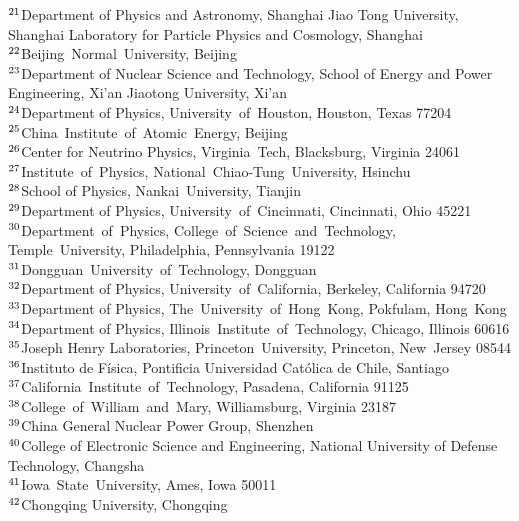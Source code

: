 {$^{21}$Department of Physics and Astronomy, Shanghai Jiao Tong University, Shanghai Laboratory for Particle Physics and Cosmology, Shanghai \\ 
$^{22}$Beijing~Normal~University, Beijing \\ 
$^{23}$Department of Nuclear Science and Technology, School of Energy and Power Engineering, Xi'an Jiaotong University, Xi'an \\ 
$^{24}$Department of Physics, University~of~Houston, Houston, Texas  77204 \\ 
$^{25}$China~Institute~of~Atomic~Energy, Beijing \\ 
$^{26}$Center for Neutrino Physics, Virginia~Tech, Blacksburg, Virginia  24061 \\ 
$^{27}$Institute~of~Physics, National~Chiao-Tung~University, Hsinchu \\ 
$^{28}$School of Physics, Nankai~University, Tianjin \\ 
$^{29}$Department of Physics, University~of~Cincinnati, Cincinnati, Ohio 45221 \\ 
$^{30}$Department~of~Physics, College~of~Science~and~Technology, Temple~University, Philadelphia, Pennsylvania  19122 \\ 
$^{31}$Dongguan~University~of~Technology, Dongguan \\ 
$^{32}$Department of Physics, University~of~California, Berkeley, California  94720 \\ 
$^{33}$Department of Physics, The~University~of~Hong~Kong, Pokfulam, Hong~Kong \\ 
$^{34}$Department of Physics, Illinois~Institute~of~Technology, Chicago, Illinois  60616 \\ 
$^{35}$Joseph Henry Laboratories, Princeton~University, Princeton, New~Jersey 08544 \\ 
$^{36}$Instituto de F\'isica, Pontificia Universidad Cat\'olica de Chile, Santiago \\ 
$^{37}$California~Institute~of~Technology, Pasadena, California 91125 \\ 
$^{38}$College~of~William~and~Mary, Williamsburg, Virginia  23187 \\ 
$^{39}$China General Nuclear Power Group, Shenzhen \\ 
$^{40}$College of Electronic Science and Engineering, National University of Defense Technology, Changsha \\ 
$^{41}$Iowa~State~University, Ames, Iowa  50011 \\ 
$^{42}$Chongqing University, Chongqing \\ 
} 
